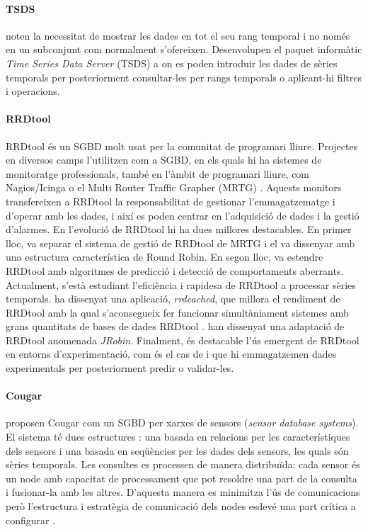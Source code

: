 \paragraph{TSDS} \textcite{weigel10} noten la necessitat de mostrar les dades en tot el seu rang temporal i no només en un subconjunt com normalment s'ofereixen. Desenvolupen el paquet informàtic \emph{Time Series Data Server} (TSDS) \parencite{tsds} a on es poden introduir les dades de sèries temporals per posteriorment consultar-les per rangs temporals o aplicant-hi filtres i operacions.





\paragraph{RRDtool} RRDtool \parencite{rrdtool} {é}s un SGBD molt usat per la comunitat de programari lliure. Projectes en diversos camps l'utilitzen com a SGBD, en els quals hi ha sistemes de monitoratge professionals, també en l'àmbit de programari lliure, com Nagios/Icinga \parencite{nagios,icinga} o el Multi Router Traffic Grapher (MRTG) \parencite{mrtg}. Aquests monitors transfereixen a RRDtool la responsabilitat de gestionar l'emmagatzematge i d'operar amb les dades, i així es poden centrar en l'adquisició de dades i la gestió d'alarmes. 
En l'evolució de RRDtool hi ha dues millores destacables. En primer lloc, \textcite{lisa98:oetiker} va separar el sistema de gestió de RRDtool de MRTG i el va dissenyar amb una estructura característica de Round Robin. En segon lloc,  \textcite{lisa00:brutlag} va estendre RRDtool amb algoritmes de predicció i detecció de comportaments aberrants. 
Actualment, s'està estudiant l'eficiència i rapidesa de RRDtool a processar sèries temporals. \textcite{carder:rrdcached} ha dissenyat una aplicació, \emph{rrdcached}, que millora el rendiment de RRDtool amb la qual s'aconsegueix fer funcionar  simultàniament sistemes amb grans quantitats de bases de dades RRDtool \parencite{lisa07:plonka}. \textcite{jrobin} han dissenyat una adaptació de RRDtool anomenada \emph{JRobin}. 
Finalment, és destacable l'ús emergent de RRDtool en entorns d'experimentació, com és el cas de \textcite{zhang07} i \textcite{chilingaryan10} que hi emmagatzemen dades experimentals per posteriorment predir o validar-les.


\paragraph{Cougar} \textcite{cougar} proposen Cougar com un SGBD per xarxes de sensors (\emph{sensor database systems}). El sistema té dues estructures \parencite{bonnet01}: una basada en relacions per les característiques dels sensors i una basada en seqüències per les dades dels sensors, les quals són sèries temporals.
Les consultes es processen de manera distribuïda: cada sensor és un node amb capacitat de processament que pot resoldre una part de la consulta i fusionar-la amb les altres. D'aquesta manera es minimitza l'ús de comunicacions però l'estructura i estratègia de comunicació dels nodes esdevé una part crítica a configurar \parencite{demers03}.

